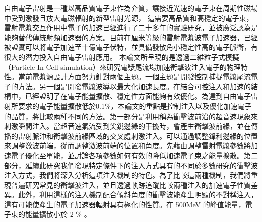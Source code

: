 
\begin{abstract*}
自由電子雷射是一種以高品質電子束作為介質，讓接近光速的電子束在周期性磁場中受到激發且放大電磁輻射的新型雷射光源，
這需要高品質和高穩定的電子束，雷射電漿交互作用中電子的加速已經進行了二十多年的實驗研究，並被廣泛認為是能夠替代傳統射頻加速器的方案。目前在厘米等級的雷射電漿波電子加速器，已經被證實可以將電子加速至十億電子伏特，並具備發散角小穩定性高的電子脈衝，有很大的潛力投入自由電子雷射應用。
本論文所呈現的是透過二維粒子式模擬（Particle-In-Cell simulation）來研究電漿尾流場加速衝擊波注入電子的物理特性。當前電漿源設計方面努力針對兩個主題。一個主題是開發控制捕捉電漿尾流電子的方法。另一個是開發電漿波導以最大化加速長度。在結合可控注入和加速的結構中，已經證明了在電子能量擴散、穩定性方面能夠有效優化。為達到自由電子雷射所要求的電子能量擴散低於0.1\%，本論文的重點是控制注入以及優化加速電子的品質，將比較兩種不同的方法。第一部分是利用稱為衝擊波前沿的超音速現象來刺激瞬間注入。當超音速氣流受到尖銳邊緣的干擾時，會產生衝擊波前緣，並在傳播的雷射脈沖和衝擊波前緣區域的交叉處刺激注入。可以通過調整鋒利邊緣的位置來調整激波前端，從而調整激波前端的位置和角度。先藉由調整雷射電漿參數將加速電子優化至單能，並討論各項參數如何有效的降低加速電子束之能量擴散。第二部分，延續此研究我們發現特定條件下的注入方式具有的不同於多數研究的衝擊波注入方式，我們將深入分析這項注入機制的特色。為了比較這兩種機制，我們將重現普遍研究常見的衝擊波注入，並且透過軌跡追蹤比較兩種注入的加速電子性質差異。此外，利用這樣的注入機制配合傾斜角度的衝擊波能產生明顯的不對稱注入，這有可能使產生的電子加速器輻射具有極化的性質。在 500MeV 的峰值能量，電子束的能量擴散小於 2 \% 。

\end{abstract*}
